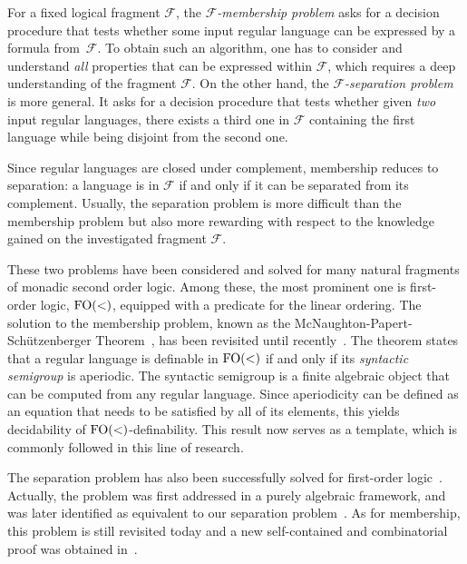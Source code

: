 \documentclass[a4paper,USenglish]{lipics}
\newcommand\Fs{\ensuremath{\mathcal{F}}\xspace}
\newcommand{\fow}{\ensuremath{\textup{FO}(<)}\xspace}
\theoremstyle{plain}
\begin{document}
For a fixed logical fragment \Fs, the \emph{\Fs-membership
  problem} asks for a decision procedure that tests whether some input
regular language can be expressed by a formula from~\Fs. To obtain
such an algorithm, one has to consider and understand \emph{all}
properties that can be expressed within \Fs, which requires a deep
understanding of the fragment \Fs. On the other hand, the
\emph{\Fs-separation problem} is more general. It asks for
a decision procedure that tests whether given \emph{two} input
regular languages, there exists a third one in \Fs containing the
first language while being disjoint from the second one.

Since regular
languages are closed under complement, membership reduces to
separation: a language is in \Fs if and only if it can be separated from
its complement. Usually, the separation problem is more difficult than
the membership problem but also more rewarding with respect to the
knowledge gained on the investigated fragment \Fs.

These two problems have been considered and solved for many natural fragments
of monadic second order logic. Among these, the most prominent one is
first-order logic, \fow, equipped with a predicate  for the linear
ordering. The solution to the membership problem, known as the
McNaughton-Papert-Schützenberger Theorem~\cite{sfo,mnpfo}, has been revisited
until recently~\cite{Diekert&Gastin:First-order-definable-languages:2008:a}.
The theorem states that a regular language is definable in \fow if and only if
its \emph{syntactic semigroup} is aperiodic. The syntactic semigroup is a
finite algebraic object that can be computed from any regular language. Since
aperiodicity can be defined as an equation that needs to be satisfied by all
of its elements, this yields decidability of \fow-definability. This result
now serves as a template, which is commonly followed in this line of research.

The separation problem has also been successfully solved for first-order logic~\cite{Henckell:Pointlike-sets:-finest-aperiodic:1988:a}.
Actually, the problem was first addressed in a purely algebraic
framework, and was later identified as equivalent to our separation
problem~\cite{MR1709911}. As for membership, this problem is still
revisited today and a new self-contained and combinatorial proof was
obtained in~\cite{PZ:lics14}.
\end{document}
